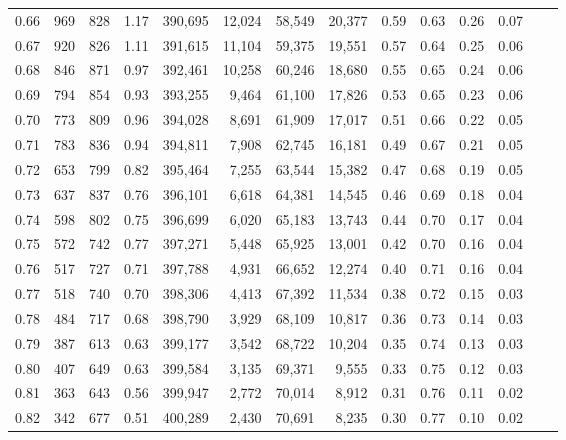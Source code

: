 \begin{tabular}{rrrrrrrrrrrrrr}
0.66 &     969 &    828 &    1.17 &  390,695 &   12,024 &  58,549 &  20,377 &  0.59 &  0.63 &  0.26 &      0.07 \\
0.67 &     920 &    826 &    1.11 &  391,615 &   11,104 &  59,375 &  19,551 &  0.57 &  0.64 &  0.25 &      0.06 \\
0.68 &     846 &    871 &    0.97 &  392,461 &   10,258 &  60,246 &  18,680 &  0.55 &  0.65 &  0.24 &      0.06 \\
0.69 &     794 &    854 &    0.93 &  393,255 &    9,464 &  61,100 &  17,826 &  0.53 &  0.65 &  0.23 &      0.06 \\
0.70 &     773 &    809 &    0.96 &  394,028 &    8,691 &  61,909 &  17,017 &  0.51 &  0.66 &  0.22 &      0.05 \\
0.71 &     783 &    836 &    0.94 &  394,811 &    7,908 &  62,745 &  16,181 &  0.49 &  0.67 &  0.21 &      0.05 \\
0.72 &     653 &    799 &    0.82 &  395,464 &    7,255 &  63,544 &  15,382 &  0.47 &  0.68 &  0.19 &      0.05 \\
0.73 &     637 &    837 &    0.76 &  396,101 &    6,618 &  64,381 &  14,545 &  0.46 &  0.69 &  0.18 &      0.04 \\
0.74 &     598 &    802 &    0.75 &  396,699 &    6,020 &  65,183 &  13,743 &  0.44 &  0.70 &  0.17 &      0.04 \\
0.75 &     572 &    742 &    0.77 &  397,271 &    5,448 &  65,925 &  13,001 &  0.42 &  0.70 &  0.16 &      0.04 \\
0.76 &     517 &    727 &    0.71 &  397,788 &    4,931 &  66,652 &  12,274 &  0.40 &  0.71 &  0.16 &      0.04 \\
0.77 &     518 &    740 &    0.70 &  398,306 &    4,413 &  67,392 &  11,534 &  0.38 &  0.72 &  0.15 &      0.03 \\
0.78 &     484 &    717 &    0.68 &  398,790 &    3,929 &  68,109 &  10,817 &  0.36 &  0.73 &  0.14 &      0.03 \\
0.79 &     387 &    613 &    0.63 &  399,177 &    3,542 &  68,722 &  10,204 &  0.35 &  0.74 &  0.13 &      0.03 \\
0.80 &     407 &    649 &    0.63 &  399,584 &    3,135 &  69,371 &   9,555 &  0.33 &  0.75 &  0.12 &      0.03 \\
0.81 &     363 &    643 &    0.56 &  399,947 &    2,772 &  70,014 &   8,912 &  0.31 &  0.76 &  0.11 &      0.02 \\
0.82 &     342 &    677 &    0.51 &  400,289 &    2,430 &  70,691 &   8,235 &  0.30 &  0.77 &  0.10 &      0.02 \\

\end{tabular}
